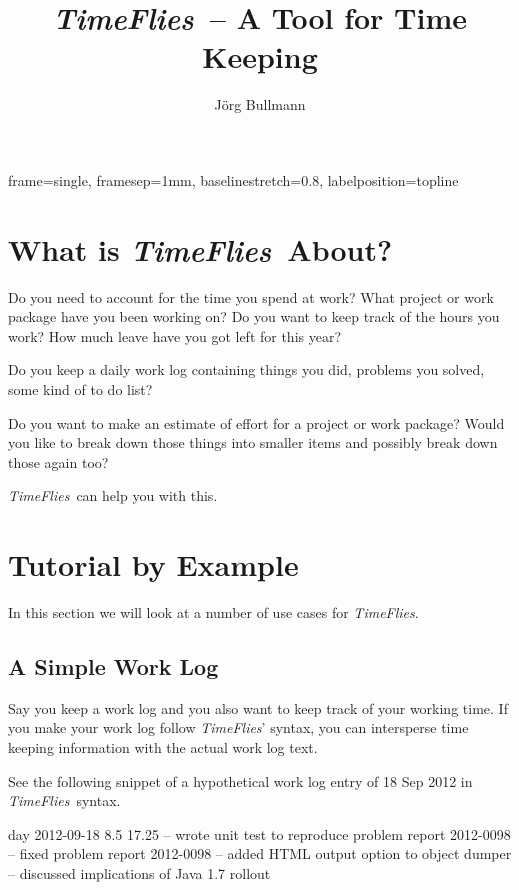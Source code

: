 \documentclass[11pt]{article}
\newcommand{\timeflies}{\emph{TimeFlies}}
\begin{document}
   {frame=single,
    framesep=1mm,
    baselinestretch=0.8,
    labelposition=topline}


\title{\timeflies\ -- A Tool for Time Keeping}
\author{J\"org Bullmann}
\maketitle
\tableofcontents
\newpage

\section{What is \timeflies\ About?}

Do you need to account for the time you spend at work? What project or work package have you been working on? Do you want to keep track of the hours you work? How much leave have you got left for this year?

Do you keep a daily work log containing things you did, problems you solved, some kind of to do list?

Do you want to make an estimate of effort for a project or work package? Would you like to break down those things into smaller items and possibly break down those again too?

\timeflies\ can help you with this.

\section{Tutorial by Example}

In this section we will look at a number of use cases for \timeflies.

\subsection{A Simple Work Log}

Say you keep a work log and you also want to keep track of your working time. If you make your work log follow \timeflies' syntax, you can intersperse time keeping information with the actual work log text.

See the following snippet of a hypothetical work log entry of 18 Sep 2012 in \timeflies\ syntax.

\begin{inputfile}
day 2012-09-18 8.5 17.25
-- wrote unit test to reproduce problem report 2012-0098
-- fixed problem report 2012-0098
-- added HTML output option to object dumper
-- discussed implications of Java 1.7 rollout
\end{inputfile}
\end{document}
